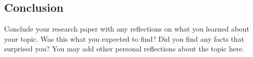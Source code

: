 \documentclass[11pt, twocolumn]{article}
\begin{document}
\subsection{Conclusion}
Conclude your research paper with any reflections on what you learned about your 
topic. Was this what you expected to find? Did you find any facts that surprised you?
You may add other personal reflections about the topic here.



\end{document}
